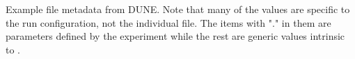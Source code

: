 












Example file metadata from DUNE. Note that many of the values are specific to the run configuration, not the individual file. The items with "." in them are parameters defined by the experiment while the rest are generic values intrinsic to .

